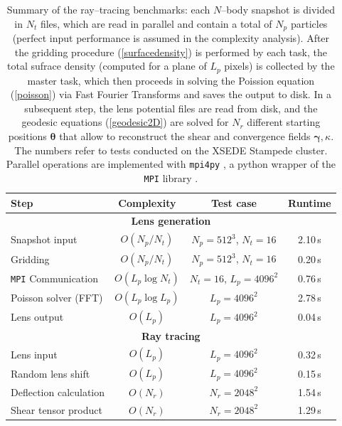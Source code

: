 \documentclass[5p]{elsarticle}
\newcommand{\ttt}[1]{\texttt{#1}}
\begin{document}
\begin{table}
\begin{center}
\begin{tabular}{l|c|c|c}
\toprule
{Step} &            Complexity &            Test case &           Runtime \\ \hline \hline
\midrule
\multicolumn{4}{c}{\textbf{Lens generation}} \\ \hline
Snapshot input & $O(N_p/N_t)$  & $N_p=512^3$, $N_t=16$  & 2.10\,s  \\
Gridding        & $O(N_p/N_t)$   & $N_p=512^3$, $N_t=16$  & 0.20\,s \\
\ttt{MPI} Communication  & $O(L_p\log{N_t})$   & $N_t=16$, $L_p=4096^2$  & 0.76\,s   \\
Poisson solver (FFT)           & $O(L_p\log{L_p})$ & $L_p=4096^2$  &  2.78\,s    \\
Lens output           & $O(L_p)$ & $L_p=4096^2$   & 0.04\,s  \\ \hline \hline

\multicolumn{4}{c}{\textbf{Ray tracing}} \\ \hline
Lens input &  $O(L_p)$ & $L_p=4096^2$ & 0.32\,s \\
Random lens shift &  $O(L_p)$ & $L_p=4096^2$ & 0.15\,s \\
Deflection calculation        &  $O(N_r)$ & $N_r=2048^2$   & 1.54\,s  \\
Shear tensor product               &  $O(N_r)$ & $N_r=2048^2$   &  1.29\,s \\ \hline \hline

\bottomrule
\end{tabular}
\caption{Summary of the ray--tracing benchmarks: each $N$--body snapshot is divided in $N_t$ files, which are read in parallel and contain a total of $N_p$ particles (perfect input performance is assumed in the complexity analysis). After the gridding procedure (\ref{surfacedensity}) is performed by each task, the total sufrace density (computed for a plane of $L_p$ pixels) is collected by the master task, which then proceeds in solving the Poission equation (\ref{poisson}) via Fast Fourier Transforms and saves the output to disk. In a subsequent step, the lens potential files are read from disk, and the geodesic equations (\ref{geodesic2D}) are solved for $N_r$ different starting positions $\pmb{\theta}$ that allow to reconstruct the shear and convergence fields $\pmb{\gamma},\kappa$. The numbers refer to tests conducted on the XSEDE Stampede cluster. Parallel operations are implemented with \ttt{mpi4py} \citep{mpi4py}, a {\sc python} wrapper of the \ttt{MPI} library \citep{MPI}.}
\label{benchmarktable}
\end{center}
\end{table}
\end{document}
